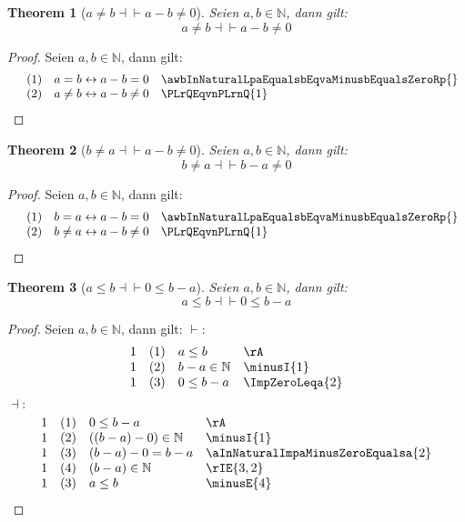 \documentclass{book}
\theoremstyle{plain}
\newtheorem{theorem}{Theorem}
\theoremstyle{remark}
\theoremstyle{definition}
\begin{document}
\label{aNotEqualsbEqvaMinusbNotEqualsZero}
\begin{theorem}[\(a\neq b\dashv\vdash a-b\neq 0\)]
Seien \(a,b\in\mathbb{N}\), dann gilt:
\[a\neq b\dashv\vdash a-b\neq 0\]
\end{theorem}
\begin{proof}
        Seien \(a,b\in\mathbb{N}\), dann gilt:
        \[
	\begin{array}{llll}
		   & (1) & a=b\leftrightarrow a-b=0 & \awbInNaturalLpaEqualsbEqvaMinusbEqualsZeroRp{} \\
		   & (2) & a\neq b\leftrightarrow a-b\neq 0 & \PLrQEqvnPLrnQ{1} \\
	\end{array}
	\]
\end{proof}



\label{bNotEqualsaEqvaMinusbNotEqualsZero}
\begin{theorem}[\(b\neq a\dashv\vdash a-b\neq 0\)]
Seien \(a,b\in\mathbb{N}\), dann gilt:
\[b\neq a\dashv\vdash b-a\neq 0\]
\end{theorem}
\begin{proof}
        Seien \(a,b\in\mathbb{N}\), dann gilt:
        \[
	\begin{array}{llll}
		   & (1) & b=a\leftrightarrow a-b=0 & \awbInNaturalLpaEqualsbEqvaMinusbEqualsZeroRp{} \\
		   & (2) & b\neq a\leftrightarrow a-b\neq 0 & \PLrQEqvnPLrnQ{1} \\
	\end{array}
	\]
\end{proof}

\label{awbInNaturalLpaLeqbEqvZeroLeqbMinusaRp}
\begin{theorem}[\(a\leq b\dashv\vdash 0\leq b-a\)]
Seien \(a,b\in\mathbb{N}\), dann gilt:
\[a\leq b\dashv\vdash 0\leq b-a\]
\end{theorem}
\begin{proof}
        Seien \(a,b\in\mathbb{N}\), dann gilt:
\(\vdash:\)
	\[
	\begin{array}{llll}
		1 & (1) & a\leq b & \rA \\
		  1 & (2) & b-a\in\mathbb{N} & \minusI{1} \\
            1 & (3) & 0\leq b-a & \ImpZeroLeqa{2} \\
	\end{array}
	\]
	\(\dashv:\)
	\[
	\begin{array}{llll}
		1 & (1) & 0\leq b-a & \rA \\
            1 & (2) & ((b-a)-0)\in\mathbb{N} & \minusI{1} \\
            1 & (3) & (b-a)-0=b-a & \aInNaturalImpaMinusZeroEqualsa{2} \\
            1 & (4) & (b-a)\in\mathbb{N} & \rIE{3,2} \\
            1 & (3) & a\leq b & \minusE{4} \\
	\end{array}
	\]
\end{proof}
\end{document}
